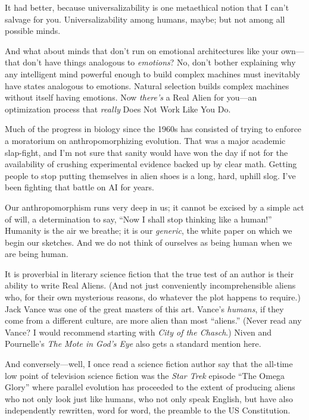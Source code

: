 {{
 It had better, because universalizability is one metaethical
notion that I can't salvage for you. Universalizability
among humans, maybe; but not among all possible minds.}

{
 And what about minds that don't run on emotional
architectures like your own---that don't have things
analogous to \textit{emotions}? No, don't bother
explaining why any intelligent mind powerful enough to build complex
machines must inevitably have states analogous to emotions. Natural
selection builds complex machines without itself having emotions. Now
\textit{there's} a Real Alien for you---an optimization
process that \textit{really} Does Not Work Like You Do.}

{
 Much of the progress in biology since the 1960s has consisted of
trying to enforce a moratorium on anthropomorphizing evolution. That
was a major academic slap-fight, and I'm not sure that
sanity would have won the day if not for the availability of crushing
experimental evidence backed up by clear math. Getting people to stop
putting themselves in alien shoes is a long, hard, uphill slog.
I've been fighting that battle on AI for years.}

{
 Our anthropomorphism runs very deep in us; it cannot be excised by
a simple act of will, a determination to say, ``Now I
shall stop thinking like a human!'' Humanity is the
air we breathe; it is our \textit{generic}, the white paper on which we
begin our sketches. And we do not think of ourselves as being human
when we are being human.}

{
 It is proverbial in literary science fiction that the true test of
an author is their ability to write Real Aliens. (And not just
conveniently incomprehensible aliens who, for their own mysterious
reasons, do whatever the plot happens to require.) Jack Vance was one
of the great masters of this art. Vance's
\textit{humans}, if they come from a different culture, are more alien
than most ``aliens.'' (Never read
any Vance? I would recommend starting with \textit{City of the
Chasch}.) Niven and Pournelle's \textit{The Mote in
God's Eye} also gets a standard mention here.}

{
 And conversely---well, I once read a science fiction author say that the all-time low point of television
science fiction was the \textit{Star Trek} episode ``The Omega Glory'' where parallel
evolution has proceeded to the extent of producing aliens who not only
look just like humans, who not only speak English, but have also
independently rewritten, word for word, the preamble to the US
Constitution.}

}
